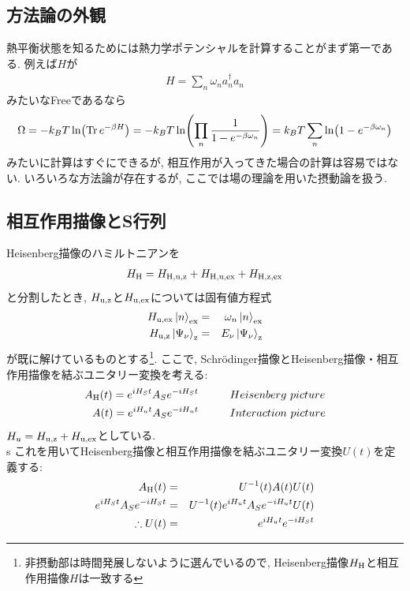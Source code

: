 \documentclass[10.5pt,a4paper]{jreport}
\newcommand{\ul}[1]{\underline{#1}}
\begin{document}
\subsection{方法論の外観}
熱平衡状態を知るためには熱力学ポテンシャルを計算することがまず第一である.
例えば$H$が
\begin{eqnarray}
  H = \sum_n \omega_n a_n^\dagger a_n
\end{eqnarray}
みたいなFreeであるなら
\begin{eqnarray}
  \Omega = -k_BT\ln(\Tr e^{-\beta H}) = -k_BT\ln(\prod_n\frac{1}{1-e^{-\beta \omega_n}}) = k_BT\sum_n\ln(1-e^{-\beta \omega_n})
\end{eqnarray}
みたいに計算はすぐにできるが, 相互作用が入ってきた場合の計算は容易ではない. いろいろな方法論が存在するが, ここでは場の理論を用いた摂動論を扱う.
\subsection{相互作用描像とS行列}
Heisenberg描像のハミルトニアンを
\begin{eqnarray}
  H_{\rm H} = H_{\rm H, u, z} + H_{\rm H, u, ex} + H_{\rm H, z, ex}
\end{eqnarray}
と分割したとき, $H_{\rm u, z}$と$H_{\rm u, ex}$については固有値方程式
\begin{eqnarray}
  H_{\rm u, ex}\ket{n}_{\rm ex} &=& \omega_n\ket{n}_{\rm ex}\\
  H_{\rm u, z}\ket{\Psi_\nu}_{\rm z} &=& E_\nu\ket{\Psi_\nu}_{\rm z}
\end{eqnarray}
が既に解けているものとする\footnote{非摂動部は時間発展しないように選んでいるので, Heisenberg描像$H_{\rm H}$と相互作用描像$H$は一致する}.
ここで, Schr\"odinger描像とHeisenberg描像・相互作用描像を結ぶユニタリー変換を考える:
\begin{eqnarray}
  A_{\rm H}(t) = e^{iH_St}A_Se^{-iH_St}\hspace{1.0cm} &Heisenberg\ picture\label{picture1}\\
  A(t) = e^{iH_ut}A_Se^{-iH_ut}\hspace{1.0cm} &Interaction\ picture\label{picture2}
\end{eqnarray}
$H_u = H_{\rm u, z} + H_{\rm u, ex}$としている.\\
s
これを用いてHeisenberg描像と相互作用描像を結ぶユニタリー変換$U(t)$を定義する:
\begin{eqnarray}
  A_{\rm H}(t) &=& U^{-1}(t)A(t)U(t)\\
  e^{iH_St}A_Se^{-iH_St} &=& U^{-1}(t)e^{iH_ut}A_Se^{-iH_ut}U(t)\\
  \therefore U(t) &=& e^{iH_ut}e^{-iH_St}
\end{eqnarray}
\end{document}
